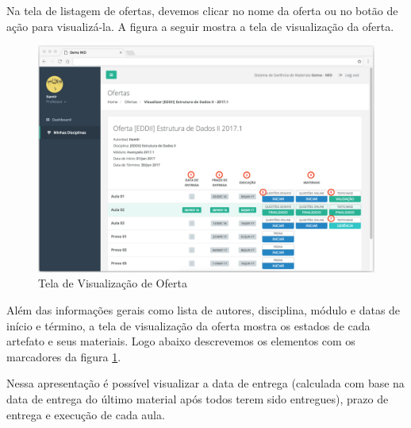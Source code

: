 Na tela de listagem de ofertas, devemos clicar no nome da oferta ou no botão de ação para visualizá-la. A figura a seguir mostra a tela de visualização da oferta.

\begin{figure}[H]
\centering
     \includegraphics[width=1.0\textwidth]{Screens/OffersShow.png}
      \caption{Tela de Visualização de Oferta}
       \label{fig:OffersShow}
\end{figure} 

Além das informações gerais como lista de autores, disciplina, módulo e datas de início e término, a tela de visualização da oferta mostra os estados de cada artefato e seus materiais. Logo abaixo descrevemos os elementos com os marcadores da figura \hyperref[fig:OffersShow]{\ref{fig:OffersShow}}.

Nessa apresentação é possível visualizar a data de entrega (calculada com base na data de entrega do último material após todos terem sido entregues), prazo de entrega e execução de cada aula.

